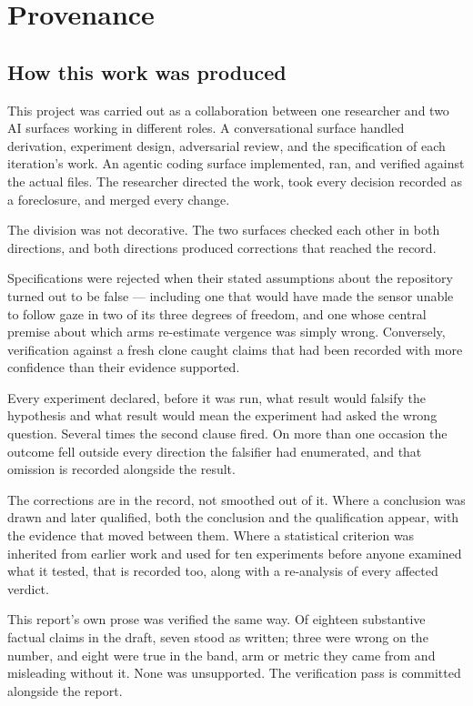 \section{Provenance}

\subsection{How this work was produced}

This project was carried out as a collaboration between one researcher and two
AI surfaces working in different roles. A conversational surface handled
derivation, experiment design, adversarial review, and the specification of each
iteration's work. An agentic coding surface implemented, ran, and verified
against the actual files. The researcher directed the work, took every decision
recorded as a foreclosure, and merged every change.

The division was not decorative. The two surfaces checked each other in both
directions, and both directions produced corrections that reached the record.

Specifications were rejected when their stated assumptions about the repository
turned out to be false --- including one that would have made the sensor unable
to follow gaze in two of its three degrees of freedom, and one whose central
premise about which arms re-estimate vergence was simply wrong. Conversely,
verification against a fresh clone caught claims that had been recorded with
more confidence than their evidence supported.

Every experiment declared, before it was run, what result would falsify the
hypothesis and what result would mean the experiment had asked the wrong
question. Several times the second clause fired. On more than one occasion the
outcome fell outside every direction the falsifier had enumerated, and that
omission is recorded alongside the result.

The corrections are in the record, not smoothed out of it. Where a conclusion
was drawn and later qualified, both the conclusion and the qualification appear,
with the evidence that moved between them. Where a statistical criterion was
inherited from earlier work and used for ten experiments before anyone examined
what it tested, that is recorded too, along with a re-analysis of every affected
verdict.

This report's own prose was verified the same way. Of eighteen substantive
factual claims in the draft, seven stood as written; three were wrong on the
number, and eight were true in the band, arm or metric they came from and
misleading without it. None was unsupported. The verification pass is committed
alongside the report.

